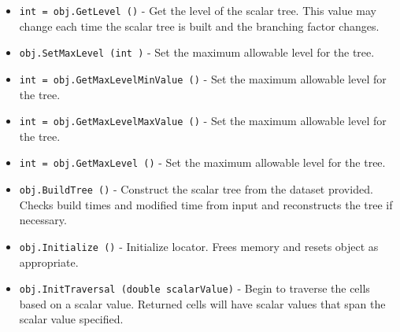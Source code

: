 \begin{itemize}
\item  \verb|int = obj.GetLevel ()| -  Get the level of the scalar tree. This value may change each time the
 scalar tree is built and the branching factor changes.

\item  \verb|obj.SetMaxLevel (int )| -  Set the maximum allowable level for the tree. 

\item  \verb|int = obj.GetMaxLevelMinValue ()| -  Set the maximum allowable level for the tree. 

\item  \verb|int = obj.GetMaxLevelMaxValue ()| -  Set the maximum allowable level for the tree. 

\item  \verb|int = obj.GetMaxLevel ()| -  Set the maximum allowable level for the tree. 

\item  \verb|obj.BuildTree ()| -  Construct the scalar tree from the dataset provided. Checks build times
 and modified time from input and reconstructs the tree if necessary.

\item  \verb|obj.Initialize ()| -  Initialize locator. Frees memory and resets object as appropriate.

\item  \verb|obj.InitTraversal (double scalarValue)| -  Begin to traverse the cells based on a scalar value. Returned cells
 will have scalar values that span the scalar value specified.

\end{itemize}
